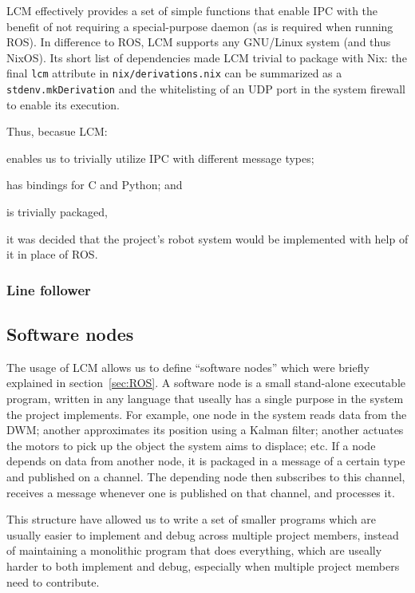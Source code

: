 LCM effectively provides a set of simple functions that enable IPC with the benefit of not requiring a special-purpose daemon (as is required when running ROS).
In difference to ROS, LCM supports any GNU/Linux system (and thus NixOS).
Its short list of dependencies made LCM trivial to package with Nix:
the final \texttt{lcm} attribute in \texttt{nix/derivations.nix} can be summarized as a \texttt{stdenv.mkDerivation} and the whitelisting of an UDP port in the system firewall to enable its execution.

Thus, becasue LCM:
\begin{inline-enum}
\item enables us to trivially utilize IPC with different message types;
\item has bindings for C and Python; and
\item is trivially packaged,
\end{inline-enum}
it was decided that the project's robot system would be implemented with help of it in place of ROS.

\subsubsection{Line follower}

\subsection{Software nodes}
The usage of LCM allows us to define ``software nodes'' which were briefly explained in section~\ref{sec:ROS}.
A software node is a small stand-alone executable program, written in any language that useally has a single purpose in the system the project implements.
For example, one node in the system reads data from the DWM;
another approximates its position using a Kalman filter;
another actuates the motors to pick up the object the system aims to displace; etc.
If a node depends on data from another node,
it is packaged in a message of a certain type and published on a channel.
The depending node then subscribes to this channel,
receives a message whenever one is published on that channel,
and processes it.

This structure have allowed us to write a set of smaller programs which are usually easier to implement and debug across multiple project members,
instead of maintaining a monolithic program that does everything, which are useally harder to both implement and debug,
especially when multiple project members need to contribute.

